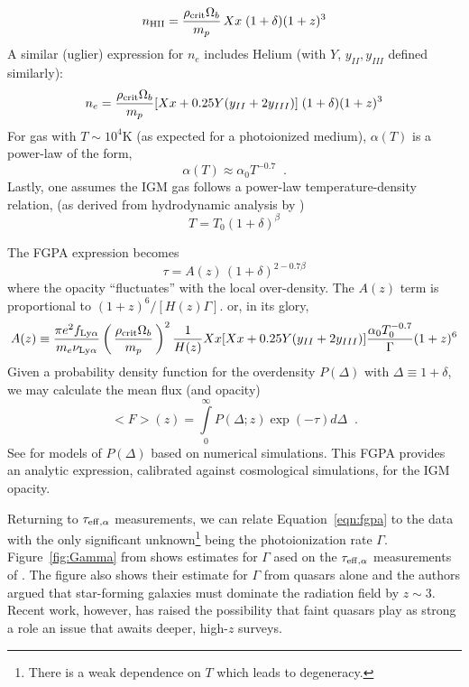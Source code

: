 \documentclass[graybox]{svmult}
\def\ltp{\left ( \,}
\def\rtp{\, \right  ) }
\def\intl{\int\limits}
\begin{document}
\begin{equation}
n_{\rm HII} = \frac{\rho_{\rm crit} \Omega_b}{m_p} \, X x \; (1+\delta) (1+z)^3
\end{equation}
A similar (uglier) expression for $n_e$ includes Helium 
(with $Y$, $y_{II}, y_{III}$ defined similarly):
\begin{equation}
n_e = \frac{\rho_{\rm crit} \Omega_b}{m_p} [Xx + 0.25Y(y_{II} + 2y_{III})] \; (1+\delta) (1+z)^3
\end{equation}
For gas with $T \sim 10^4$K (as expected for a photoionized medium),
$\alpha(T)$ is a power-law of the form,
\begin{equation}
\alpha(T) \approx \alpha_0 T^{-0.7} \;\; .
\end{equation}
Lastly, one assumes the IGM gas follows a power-law temperature-density
relation, (as derived from hydrodynamic analysis by \cite{hui97})
\begin{equation}
T = T_0 (1+\delta)^\beta
\label{eqn:rhoT}
\end{equation}

The FGPA expression becomes
\begin{equation}
\tau = A(z) \, (1+\delta)^{2 - 0.7 \beta}
\end{equation}
where the opacity ``fluctuates'' with the local over-density.
The $A(z)$ term is proportional to  $(1+z)^6 / [H(z) \Gamma]$.
or, in its glory,
\begin{equation}
A(z) \equiv \frac{\pi e^2 f_{\rm Ly\alpha}}{m_e \nu_{\rm Ly\alpha}}
\ltp \frac{\rho_{\rm crit} \Omega_b}{m_p} \rtp^2 
\frac{1}{H(z)} Xx [Xx + 0.25Y(y_{II} + 2y_{III})] \frac{\alpha_0 T_0^{-0.7}}{\Gamma}
(1+z)^6
\end{equation}
Given a probability density function for the overdensity
$P(\Delta)$ with $\Delta \equiv 1 + \delta$, we 
may calculate the mean flux (and opacity)
\begin{equation}
<F>(z) = \intl_0^\infty P(\Delta; z) \exp(-\tau) d\Delta \;\; .
\label{eqn:fgpa}
\end{equation}
See \cite{miralda00} for models of $P(\Delta)$
based on numerical simulations.
This FGPA provides an analytic expression, calibrated
against cosmological simulations, for the IGM opacity.

Returning to $\tau_{\rm eff,\alpha}$ measurements,
we can relate Equation~\ref{eqn:fgpa} to the data
with the only significant unknown\footnote{There is a
weak dependence on $T$ which leads to degeneracy.} 
being the photoionization rate $\Gamma$.
Figure~\ref{fig:Gamma} from \cite{fg08c}
shows estimates for $\Gamma$
ased on the $\tau_{\rm eff,\alpha}$ measurements of 
\cite{fg08a}.  The figure also shows their  
estimate for $\Gamma$ from quasars alone and the
authors argued that star-forming galaxies
must dominate the radiation field by $z \sim 3$.
Recent work, however, has raised the possibility
that faint quasars play as strong a role
\cite{giallongo15,hm15} an issue that awaits
deeper, high-$z$ surveys.
\end{document}
